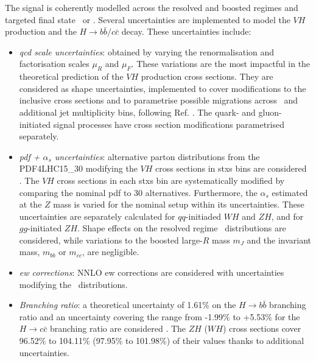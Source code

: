 The signal is coherently modelled across the resolved and boosted regimes and targeted final state \vhb\ or \vhc. Several uncertainties are implemented to model the $VH$ production and the $H \rightarrow b\bar{b}/c\bar{c}$ decay. These uncertainties include:
\begin{itemize}[leftmargin=*]
    \item \textit{\gls{qcd} scale uncertainties}: obtained by varying the renormalisation and factorisation scales $\mu_R$ and $\mu_F$. These variations are the most impactful in the theoretical prediction of the $VH$ production cross sections. They are considered as shape uncertainties, implemented to cover modifications to the inclusive cross sections and to parametrise possible migrations across \ptv\ and additional jet multiplicity bins, following Ref. \cite{ATL-PHYS-PUB-2018-035}. The quark- and gluon-initiated signal processes have cross section modifications parametrised separately. 
    \item \textit{\gls{pdf} + $\alpha_s$ uncertainties}: alternative parton distributions from the \textsc{PDF4LHC15\_30} modifying the $VH$ cross sections in \gls{stxs} bins are considered \cite{Butterworth:2015oua}. The $VH$ cross sections in each \gls{stxs} bin are systematically modified by comparing the nominal \gls{pdf} to 30 alternatives. Furthermore, the $\alpha_s$ estimated at the $Z$ mass is varied for the nominal setup within its uncertainties. These uncertainties are separately calculated for $qq$-initiaded $WH$ and $ZH$, and for $gg$-initiated $ZH$. Shape effects on the resolved regime \ptv\ distributions are considered, while variations to the boosted large-$R$ mass $m_J$ and the invariant mass, $m_{bb}$ or $m_{cc}$, are negligible.
    \item \textit{\gls{ew} corrections}: NNLO \gls{ew} corrections are considered with uncertainties modifying the \ptv\ distributions.
    \item \textit{Branching ratio}: a theoretical uncertainty of 1.61\% on the $H \rightarrow{b\bar{b}}$ branching ratio and an uncertainty covering the range from -1.99\% to +5.53\% for the $H \rightarrow{c\bar{c}}$ branching ratio are considered \cite{LHCHiggsCrossSectionWorkingGroup:2016ypw}. The $ZH$ ($WH$) cross sections cover 96.52\% to 104.11\% (97.95\% to 101.98\%) of their values thanks to additional uncertainties.

\end{itemize}
